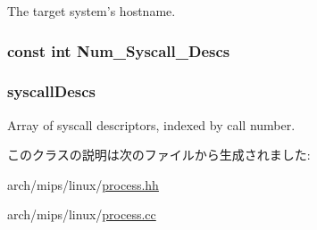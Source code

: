 The target system's hostname. \hypertarget{classMipsLinuxProcess_a9534988905c6f5c8c57c4b6a7b179fea}{
\subsubsection[{Num\_\-Syscall\_\-Descs}]{\setlength{\rightskip}{0pt plus 5cm}const int {\bf Num\_\-Syscall\_\-Descs}}}
\label{classMipsLinuxProcess_a9534988905c6f5c8c57c4b6a7b179fea}
\hypertarget{classMipsLinuxProcess_a08d67a94820b75842e07f030e548372e}{
\subsubsection[{syscallDescs}]{ {\bf syscallDescs}}}
\label{classMipsLinuxProcess_a08d67a94820b75842e07f030e548372e}


Array of syscall descriptors, indexed by call number. 

このクラスの説明は次のファイルから生成されました:\begin{DoxyCompactItemize}
\item 
arch/mips/linux/\hyperlink{arch_2mips_2linux_2process_8hh}{process.hh}\item 
arch/mips/linux/\hyperlink{arch_2mips_2linux_2process_8cc}{process.cc}\end{DoxyCompactItemize}
